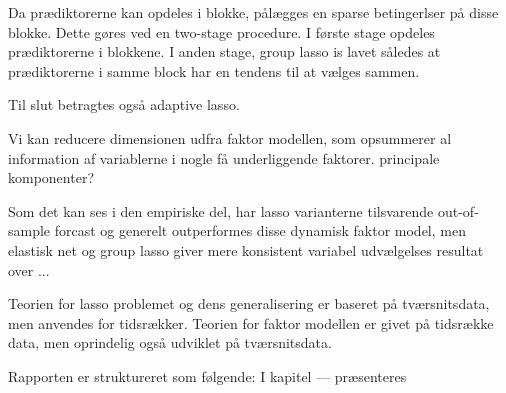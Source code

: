 Da prædiktorerne kan opdeles i blokke, pålægges en sparse betingerlser på disse blokke.
Dette gøres ved en two-stage procedure.
I første stage opdeles prædiktorerne i blokkene. I anden stage, group lasso \citep{group_lasso} is lavet således at prædiktorerne i samme block har en tendens til at vælges sammen.

Til slut betragtes også adaptive lasso.


Vi kan reducere dimensionen udfra faktor modellen, som opsummerer al information af variablerne i nogle få underliggende faktorer.
principale komponenter?

Som det kan ses i den empiriske del, har lasso varianterne tilsvarende out-of-sample forcast og generelt outperformes disse dynamisk faktor model, men elastisk net og group lasso giver mere konsistent variabel udvælgelses resultat over ...





Teorien for lasso problemet og dens generalisering er baseret på tværsnitsdata, men anvendes for tidsrækker.
Teorien for faktor modellen er givet på tidsrække data, men oprindelig også udviklet på tværsnitsdata.


Rapporten er struktureret som følgende:
I kapitel --- præsenteres 
